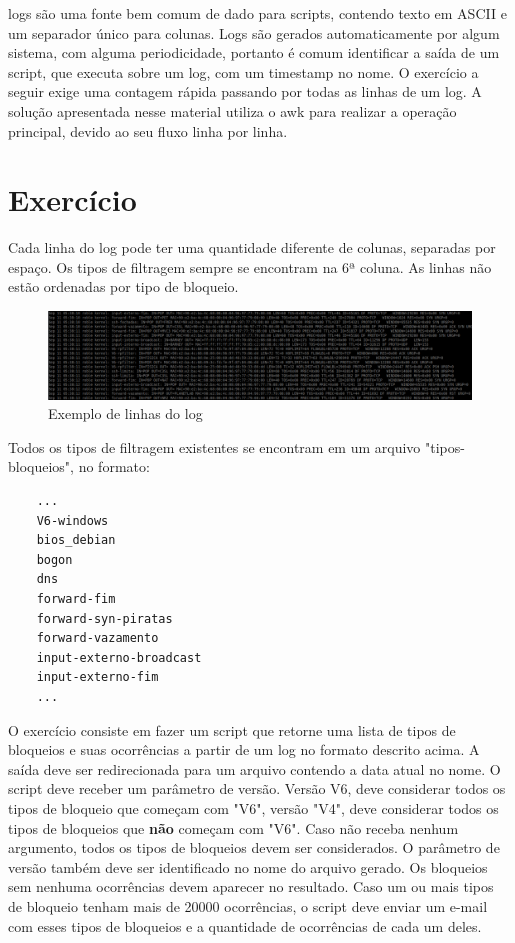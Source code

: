 \documentclass[oneside, 11 pt]{article}
\begin{document}
	logs são uma fonte bem comum de dado para scripts, contendo texto em ASCII e um separador único para colunas. Logs são gerados automaticamente por algum sistema, com alguma periodicidade, portanto é comum identificar a saída de um script, que executa sobre um log, com um timestamp no nome. O exercício a seguir exige uma contagem rápida passando por todas as linhas de um log. A solução apresentada nesse material utiliza o awk para realizar a operação principal, devido ao seu fluxo linha por linha.
	
	\section{Exercício}
	Cada linha do log pode ter uma quantidade diferente de colunas, separadas por espaço. Os tipos de filtragem sempre se encontram na 6ª coluna. As linhas não estão ordenadas por tipo de bloqueio.
	
	\begin{figure}[h]
		\includegraphics[width=\linewidth]{loglines.png}
		\caption{Exemplo de linhas do log}
		\label{fig:loglines}
	\end{figure}
	
	\pagebreak
	Todos os tipos de filtragem existentes se encontram em um arquivo "tipos-bloqueios", no formato:
	
	\begin{lstlisting}
	...
	V6-windows
	bios_debian
	bogon
	dns
	forward-fim
	forward-syn-piratas
	forward-vazamento
	input-externo-broadcast
	input-externo-fim
	...
	\end{lstlisting}
	
	O exercício consiste em fazer um script que retorne uma lista de tipos de bloqueios e suas ocorrências a partir de um log no formato descrito acima. A saída deve ser redirecionada para um arquivo contendo a data atual no nome. O script deve receber um parâmetro de versão. Versão V6, deve considerar todos os tipos de bloqueio que começam com "V6", versão "V4", deve considerar todos os tipos de bloqueios que \textbf{não} começam com "V6". Caso não receba nenhum argumento, todos os tipos de bloqueios devem ser considerados. O parâmetro de versão também deve ser identificado no nome do arquivo gerado. Os bloqueios sem nenhuma ocorrências devem aparecer no resultado. Caso um ou mais tipos de bloqueio tenham mais de 20000 ocorrências, o script deve enviar um e-mail com esses tipos de bloqueios e a quantidade de ocorrências de cada um deles.
	
\end{document}
